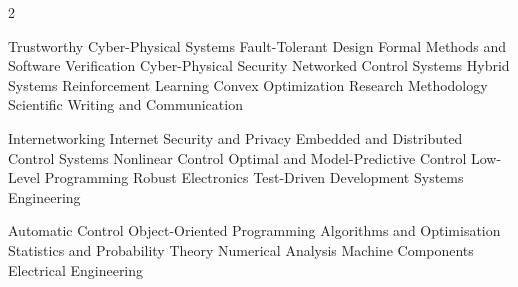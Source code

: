 

\makecvheader


\begin{paracol}{2}




Trustworthy Cyber-Physical Systems \textbullet{}
Fault-Tolerant Design \textbullet{}
Formal Methods and Software Verification \textbullet{}
Cyber-Physical Security \textbullet{}
Networked Control Systems \textbullet{}
Hybrid Systems \textbullet{}
Reinforcement Learning \textbullet{}
Convex Optimization \textbullet{}
Research Methodology \textbullet{}
Scientific Writing and Communication

\divider


Internetworking \textbullet{} 
Internet Security and Privacy \textbullet{} 
Embedded and Distributed Control Systems \textbullet{} 
Nonlinear Control \textbullet{}
Optimal and Model-Predictive Control \textbullet{}
Low-Level Programming \textbullet{}
Robust Electronics \textbullet{}
Test-Driven Development \textbullet{} 
Systems Engineering

\divider


Automatic Control \textbullet{}
Object-Oriented Programming \textbullet{}
Algorithms and Optimisation \textbullet{}
Statistics and Probability Theory \textbullet{}
Numerical Analysis \textbullet{}
Machine Components \textbullet{}
Electrical Engineering

\hfill


\end{paracol}
